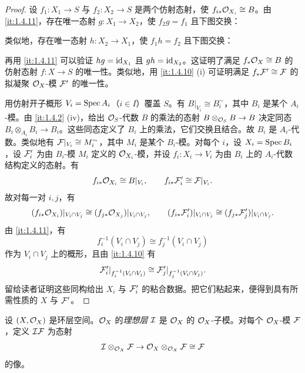 \begin{proof}
设 $f_1\colon X_1\to S$ 与 $f_2\colon X_2\to S$ 是两个仿射态射，使 $f_{i*}\mathcal{O}_{X_i}\cong B$。由 \ref{it:1.4.11}，存在唯一态射 $g\colon X_1\to X_2$，使 $f_2g=f_1$ 且下图交换：
\begin{center}
\end{center}
类似地，存在唯一态射 $h\colon X_2\to X_1$，使 $f_1h=f_2$ 且下图交换：
\begin{center}
\end{center}
再用 \ref{it:1.4.11} 可以验证 $hg=\operatorname{id}_{X_1}$ 且 $gh=\operatorname{id}_{X_2}$。这证明了满足 $f_*\mathcal{O}_X\cong B$ 的仿射态射 $f\colon X\to S$ 的唯一性。类似地，用 \ref{it:1.4.10} (i) 可证明满足 $f_*\mathcal{F}'\cong\mathcal{F}$ 的拟凝聚 $\mathcal{O}_X$-模 $\mathcal{F}'$ 的唯一性。

用仿射开子概形 $V_i=\operatorname{Spec} A_i$（$i\in I$）覆盖 $S$。有 $B|_{V_i}\cong B_i^\sim$，其中 $B_i$ 是某个 $A_i$-模。由 \ref{it:1.4.2} (iv)，给出 $\mathcal{O}_S$-代数 $B$ 的乘法的态射 $B\otimes_{\mathcal{O}_S}B\to B$ 决定同态 $B_i\otimes_{A_i}B_i\to B_i$。这些同态定义了 $B_i$ 上的乘法，它们交换且结合。故 $B_i$ 是 $A_i$-代数。类似地有 $\mathcal{F}|_{V_i}\cong M_i^\sim$，其中 $M_i$ 是某个 $B_i$-模。对每个 $i$，设 $X_i=\operatorname{Spec} B_i$，设 $\mathcal{F}_i'$ 为由 $B_i$-模 $M_i$ 定义的 $\mathcal{O}_{X_i}$-模，并设 $f_i\colon X_i\to V_i$ 为由 $B_i$ 上的 $A_i$-代数结构定义的态射。有
\[
f_{i*}\mathcal{O}_{X_i}\cong B|_{V_i},\qquad f_{i*}\mathcal{F}_i'\cong\mathcal{F}|_{V_i}.
\]
故对每一对 $i,j$，有
\[
(f_{i*}\mathcal{O}_{X_i})|_{V_i\cap V_j}\cong(f_{j*}\mathcal{O}_{X_j})|_{V_i\cap V_j},\qquad
(f_{i*}\mathcal{F}_i')|_{V_i\cap V_j}\cong(f_{j*}\mathcal{F}_j')|_{V_i\cap V_j}.
\]
由 \ref{it:1.4.11}，有
\[
f_i^{-1}(V_i\cap V_j)\cong f_j^{-1}(V_i\cap V_j)
\]
作为 $V_i\cap V_j$ 上的概形，且由 \ref{it:1.4.10} 有
\[
\mathcal{F}_i'|_{f_i^{-1}(V_i\cap V_j)}\cong\mathcal{F}_j'|_{f_j^{-1}(V_i\cap V_j)}.
\]
留给读者证明这些同构给出 $X_i$ 与 $\mathcal{F}_i'$ 的粘合数据。把它们粘起来，便得到具有所需性质的 $X$ 与 $\mathcal{F}'$。
\end{proof}

设 $(X,\mathcal{O}_X)$ 是环层空间。$\mathcal{O}_X$ 的\emph{理想层} $\mathcal{I}$ 是 $\mathcal{O}_X$ 的 $\mathcal{O}_X$-子模。对每个 $\mathcal{O}_X$-模 $\mathcal{F}$，定义 $\mathcal{I}\mathcal{F}$ 为态射
\[
\mathcal{I}\otimes_{\mathcal{O}_X}\mathcal{F}\to\mathcal{O}_X\otimes_{\mathcal{O}_X}\mathcal{F}\cong\mathcal{F}
\]
的像。

